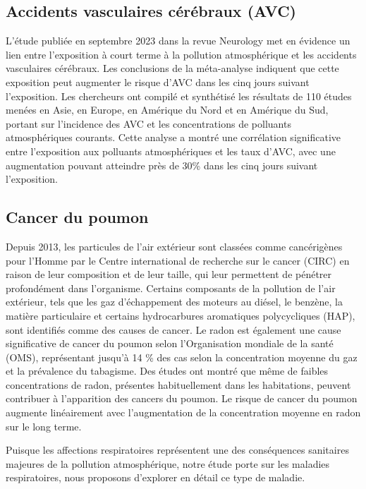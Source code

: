 \documentclass{report}
\begin{document}
\subsection{Accidents vasculaires cérébraux (AVC)}
L'étude publiée en septembre 2023 dans la revue Neurology met en évidence un lien entre l'exposition à court terme à la pollution atmosphérique et les accidents vasculaires cérébraux. Les conclusions de la méta-analyse indiquent que cette exposition peut augmenter le risque d'AVC dans les cinq jours suivant l'exposition. Les chercheurs ont compilé et synthétisé les résultats de 110 études menées en Asie, en Europe, en Amérique du Nord et en Amérique du Sud, portant sur l'incidence des AVC et les concentrations de polluants atmosphériques courants. Cette analyse a montré une corrélation significative entre l'exposition aux polluants atmosphériques et les taux d'AVC, avec une augmentation pouvant atteindre près de 30\% dans les cinq jours suivant l'exposition.

\subsection{Cancer du poumon}
Depuis 2013, les particules de l’air extérieur sont classées comme cancérigènes pour l’Homme par le Centre international de recherche sur le cancer (CIRC) en raison de leur composition et de leur taille, qui leur permettent de pénétrer profondément dans l’organisme. Certains composants de la pollution de l’air extérieur, tels que les gaz d’échappement des moteurs au diésel, le benzène, la matière particulaire et certains hydrocarbures aromatiques polycycliques (HAP), sont identifiés comme des causes de cancer.
Le radon est également une cause significative de cancer du poumon selon l’Organisation mondiale de la santé (OMS), représentant jusqu'à 14 \% des cas selon la concentration moyenne du gaz et la prévalence du tabagisme. Des études ont montré que même de faibles concentrations de radon, présentes habituellement dans les habitations, peuvent contribuer à l'apparition des cancers du poumon. Le risque de cancer du poumon augmente linéairement avec l'augmentation de la concentration moyenne en radon sur le long terme.
\cite{OMS-2023}

\vspace*{1cm}
      Puisque les affections respiratoires représentent une des conséquences sanitaires majeures de la	 pollution atmosphérique, notre étude porte sur les maladies respiratoires, nous proposons d’explorer en détail ce type de maladie. 
\end{document}
